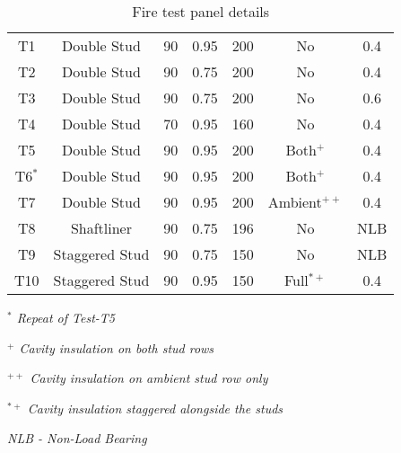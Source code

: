 \begin{table}[!htbp]
	\begin{threeparttable}
		\centering
			\caption{Fire test panel details}
				\begin{tabular}{ccccccc}
					\toprule
					\multicolumn{1}{m{2.4em}}{\centering{Test Name}} & 
					\multicolumn{1}{m{5.6em}}{\centering{Description}} & 
					\multicolumn{1}{m{2.85em}}{\centering{Stud Depth (mm)}} & 
					\multicolumn{1}{m{5em}}{\centering{Stud Thickness (mm)}} & 
					\multicolumn{1}{m{2.85em}}{\centering{Cavity Depth (mm)}} & 
					\multicolumn{1}{m{5em}}{\centering{Cavity Insulation}} &
					\multicolumn{1}{m{3em}}{\centering{Load Ratio}}\\
					\midrule
					T1  & Double Stud & 90 & 0.95 & 200 & No & 0.4 \\
					T2  & Double Stud & 90 & 0.75 & 200 & No & 0.4 \\
					T3  & Double Stud & 90 & 0.75 & 200 & No & 0.6 \\
					T4  & Double Stud & 70 & 0.95 & 160 & No & 0.4 \\
					T5  & Double Stud & 90 & 0.95 & 200 & Both\(^+\) & 0.4 \\
					T6\(^*\)  & Double Stud & 90 & 0.95 & 200 & Both\(^+\) & 0.4 \\
					T7  & Double Stud & 90 & 0.95 & 200 & Ambient\(^{++}\) & 0.4 \\
					T8  & Shaftliner & 90 & 0.75 & 196 & No & NLB\\
					T9  & Staggered Stud & 90 & 0.75 & 150 & No & NLB\\
					T10  & Staggered Stud & 90 & 0.95 & 150 & Full\(^{*+}\) & 0.4 \\
					\bottomrule
				\end{tabular}%
				\label{tab:test-specimens}%
					\begin{tablenotes}
						\small
						\item \textit{\(^*\) Repeat of Test-T5}
						\item \textit{\(^+\) Cavity insulation on both stud rows}
						\item \textit{\(^{++}\) Cavity insulation on ambient stud row only}
						\item \textit{\(^{*+}\) Cavity insulation staggered alongside the studs}
						\item \textit{NLB - Non-Load Bearing}
					\end{tablenotes}
		\end{threeparttable}
\end{table}%
